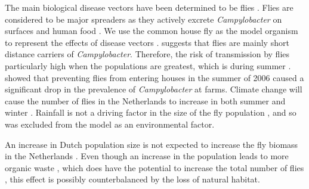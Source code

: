The main biological disease vectors have been determined to be flies  \parencite{mughini-gras_quantifying_2016}. Flies are considered to be major spreaders as they actively excrete \textit{Campylobacter} on surfaces and human food \parencite{french_molecular_2009, hald_influxed_2008, berndtson_campylobacter_1996}. We use the common house fly as the model organism to represent the effects of disease vectors \parencite{hald_influxed_2008}. \cite{skovgard_retention_2011} suggests that flies are mainly short distance carriers of \textit{Campylobacter}. Therefore, the risk of transmission by flies particularly high when the populations are greatest, which is during summer \parencite{royden_role_2016}. \cite{hald_use_2007} showed that preventing flies from entering houses in the summer of 2006 caused a significant drop in the prevalence of \textit{Campylobacter} at farms. 
Climate change will cause the number of flies in the Netherlands to increase in both summer and winter \parencite{goulson_predicting_2005}. Rainfall is not a driving factor in the size of the fly population \parencite{goulson_predicting_2005}, and so was excluded from the model as an environmental factor.


An increase in Dutch population size is not expected to increase the fly biomass in the Netherlands \parencite{guenat_effects_2019}. Even though an increase in the population leads to more organic waste \parencite{garcia-garcia_framework_2015}, which does have the potential to increase the total number of flies \parencite{imai_population_1984, rozendaal_houseflies_1997}, this effect is possibly counterbalanced by the loss of natural habitat.



